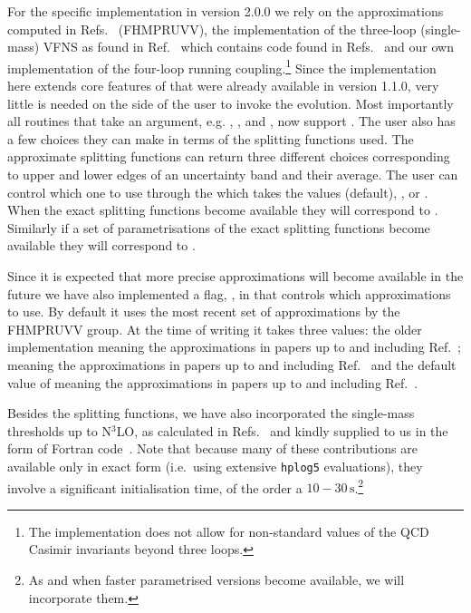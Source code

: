 For the specific implementation in \hoppet version 2.0.0 we rely on
the approximations computed in
Refs.~\cite{Davies:2016jie,Moch:2017uml,Falcioni:2023luc,Falcioni:2023vqq,Moch:2023tdj,Falcioni:2024xyt,Falcioni:2024qpd} (FHMPRUVV),
the implementation of the three-loop (single-mass) VFNS as found in
Ref.~\cite{BlumleinCode} which contains code found in
Refs.~\cite{Ablinger:2024xtt,Fael:2022miw} and our own implementation
of the four-loop running coupling.\footnote{The implementation does
not allow for non-standard values of the QCD Casimir invariants beyond
three loops.}
%
Since the implementation here extends core features of \hoppet that
were already available in version 1.1.0, very little is needed on the
side of the user to invoke the evolution.
%
Most importantly all routines that take an  argument,
e.g. , , and
, now support .
%
The user also has a few choices they can make in terms of the
splitting functions used.
%
The approximate splitting functions can return
three different
choices corresponding to upper and lower edges of an uncertainty band and their
average. 
%
The user can control which one to use through the
 which takes the values
 (default),
, or .
%
When the exact splitting functions become available they will
correspond to .
%
Similarly if a set of parametrisations of the exact splitting
functions become available they will correspond to
.

Since it is expected that more precise approximations will become
available in the future we have also implemented a flag,
, in
 that controls which approximations
to use. By default it uses the most recent set of approximations by
the FHMPRUVV group. At the time of writing it takes three values: the
older implementation
 meaning the
approximations in papers up to and including Ref.~\cite{Moch:2023tdj};
 meaning the
approximations in papers up to and including
Ref.~\cite{Falcioni:2024xyt} and the default value of
 meaning the
approximations in papers up to and including
Ref.~\cite{Falcioni:2024qpd}.

Besides the splitting functions, we have also incorporated the
single-mass thresholds up to N$^3$LO, as calculated in
Refs.~\cite{Bierenbaum:2009mv,Ablinger:2010ty,Kawamura:2012cr,Blumlein:2012vq,ABLINGER2014263,Ablinger:2014nga,Ablinger:2014vwa,Behring:2014eya,Ablinger:2019etw,Behring:2021asx,Ablinger:2023ahe,Ablinger:2024xtt}
and kindly supplied to us in the form of Fortran
code~\cite{BlumleinCode,Fael:2022miw}.
%
Note that because many of these contributions are available only in
exact form (i.e.\ using extensive \texttt{hplog5} evaluations), they
involve a significant initialisation time, of the order a
$10{-}30\,\text{s}$.\footnote{As and when faster 
  parametrised versions become available, we will incorporate them.}


